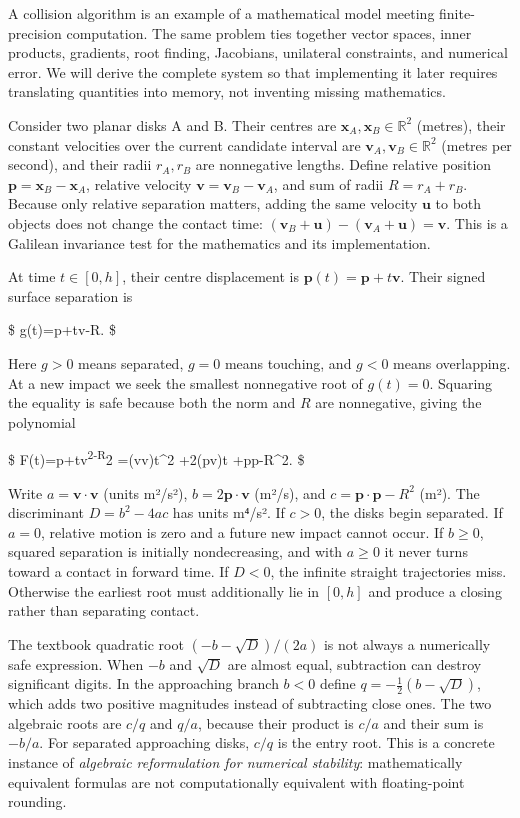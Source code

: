 A collision algorithm is an example of a mathematical model meeting finite-precision computation. The same problem ties together vector spaces, inner products, gradients, root finding, Jacobians, unilateral constraints, and numerical error. We will derive the complete system so that implementing it later requires translating quantities into memory, not inventing missing mathematics.

Consider two planar disks A and B. Their centres are \(\mathbf x_A,\mathbf x_B\in\mathbb R^2\) (metres), their constant velocities over the current candidate interval are \(\mathbf v_A,\mathbf v_B\in\mathbb R^2\) (metres per second), and their radii \(r_A,r_B\) are nonnegative lengths. Define relative position \(\mathbf p=\mathbf x_B-\mathbf x_A\), relative velocity \(\mathbf v=\mathbf v_B-\mathbf v_A\), and sum of radii \(R=r_A+r_B\). Because only relative separation matters, adding the same velocity \(\mathbf u\) to both objects does not change the contact time: \((\mathbf v_B+\mathbf u)-(\mathbf v_A+\mathbf u)=\mathbf v\). This is a Galilean invariance test for the mathematics and its implementation.

At time \(t\in[0,h]\), their centre displacement is \(\mathbf p(t)=\mathbf p+t\mathbf v\). Their signed surface separation is

\$ g(t)=\textbar{}\mathbf p+t\mathbf v\textbar-R. \$

Here \(g>0\) means separated, \(g=0\) means touching, and \(g<0\) means overlapping. At a new impact we seek the smallest nonnegative root of \(g(t)=0\). Squaring the equality is safe because both the norm and \(R\) are nonnegative, giving the polynomial

\$ F(t)=\textbar{}\mathbf p+t\mathbf v\textbar{}\textsuperscript{2-R}2 =(\mathbf v\cdot\mathbf v)t\^{}2 +2(\mathbf p\cdot\mathbf v)t +\mathbf p\cdot\mathbf p-R\^{}2. \$

Write \(a=\mathbf v\cdot\mathbf v\) (units m²/s²), \(b=2\mathbf p\cdot\mathbf v\) (m²/s), and \(c=\mathbf p\cdot\mathbf p-R^2\) (m²). The discriminant \(D=b^2-4ac\) has units m⁴/s². If \(c>0\), the disks begin separated. If \(a=0\), relative motion is zero and a future new impact cannot occur. If \(b\ge0\), squared separation is initially nondecreasing, and with \(a\ge0\) it never turns toward a contact in forward time. If \(D<0\), the infinite straight trajectories miss. Otherwise the earliest root must additionally lie in \([0,h]\) and produce a closing rather than separating contact.

The textbook quadratic root \((-b-\sqrt D)/(2a)\) is not always a numerically safe expression. When \(-b\) and \(\sqrt D\) are almost equal, subtraction can destroy significant digits. In the approaching branch \(b<0\) define \(q=-\tfrac12(b-\sqrt D)\), which adds two positive magnitudes instead of subtracting close ones. The two algebraic roots are \(c/q\) and \(q/a\), because their product is \(c/a\) and their sum is \(-b/a\). For separated approaching disks, \(c/q\) is the entry root. This is a concrete instance of \emph{algebraic reformulation for numerical stability}: mathematically equivalent formulas are not computationally equivalent with floating-point rounding.

